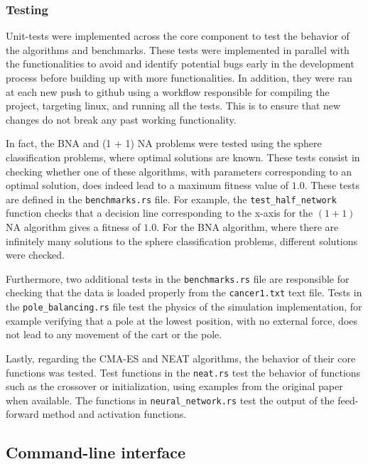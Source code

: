 \subsubsection{Testing}

Unit-tests were implemented across the core component to test the behavior of the algorithms and benchmarks.
These tests were implemented in parallel with the functionalities to avoid and identify potential bugs early in the development process before
building up with more functionalities. In addition, they were ran at each new push to github using a workflow responsible for compiling the project,
targeting linux, and running all the tests. This is to ensure that new changes do not break any past working functionality.

In fact, the BNA and (1 + 1) NA problems were tested using the sphere classification problems, where optimal solutions are known. These tests
consist in checking whether one of these algorithms, with parameters corresponding to an optimal solution, does indeed lead to a maximum fitness value
of $1.0$. These tests are defined in the \texttt{benchmarks.rs} file. For example, the \texttt{test\_half\_network} function checks that a decision line
corresponding to the x-axis for the $(1 + 1)$ NA algorithm gives a fitness of $1.0$. For the BNA algorithm, where there are infinitely many
solutions to the sphere classification problems, different solutions were checked.

Furthermore, two additional tests in the \texttt{benchmarks.rs} file are responsible for checking that the data is loaded properly from the \texttt{cancer1.txt}
text file. Tests in the \texttt{pole\_balancing.rs} file test the physics of the simulation implementation, for example verifying that a pole at the lowest
position, with no external force, does not lead to any movement of the cart or the pole.

Lastly, regarding the CMA-ES and NEAT algorithms, the behavior of their core functions was tested. Test functions in the \texttt{neat.rs} test the
behavior of functions such as the crossover or initialization, using examples from the original paper \cite{neat} when available. The functions in
\texttt{neural\_network.rs} test the output of the feed-forward method and activation functions.

\subsection{Command-line interface}

